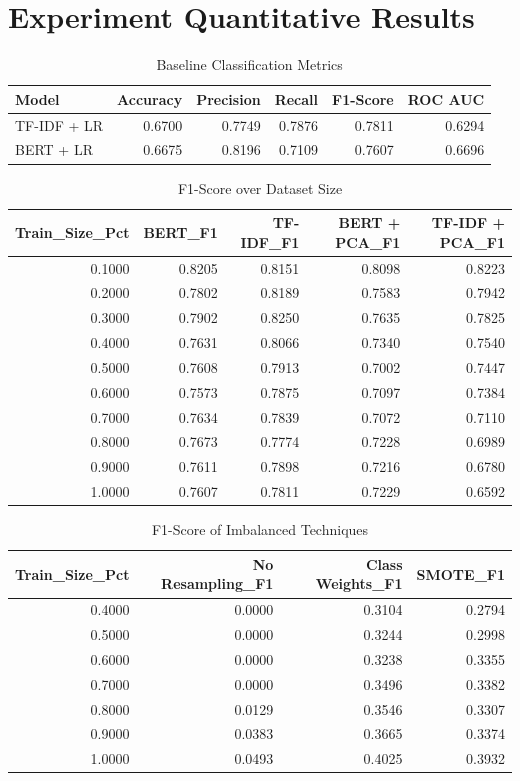 \section*{Experiment Quantitative Results}\n\n%
\begin{table}
\caption{Baseline Classification Metrics}
\label{tab:baseline}
\begin{tabular}{lrrrrr}
\hline
Model & Accuracy & Precision & Recall & F1-Score & ROC AUC \\
\hline
TF-IDF + LR & 0.6700 & 0.7749 & 0.7876 & 0.7811 & 0.6294 \\
BERT + LR & 0.6675 & 0.8196 & 0.7109 & 0.7607 & 0.6696 \\
\hline
\end{tabular}
\end{table}


\begin{table}
\caption{F1-Score over Dataset Size}
\label{tab:learning_curve}
\begin{tabular}{rrrrr}
\hline
Train_Size_Pct & BERT_F1 & TF-IDF_F1 & BERT + PCA_F1 & TF-IDF + PCA_F1 \\
\hline
0.1000 & 0.8205 & 0.8151 & 0.8098 & 0.8223 \\
0.2000 & 0.7802 & 0.8189 & 0.7583 & 0.7942 \\
0.3000 & 0.7902 & 0.8250 & 0.7635 & 0.7825 \\
0.4000 & 0.7631 & 0.8066 & 0.7340 & 0.7540 \\
0.5000 & 0.7608 & 0.7913 & 0.7002 & 0.7447 \\
0.6000 & 0.7573 & 0.7875 & 0.7097 & 0.7384 \\
0.7000 & 0.7634 & 0.7839 & 0.7072 & 0.7110 \\
0.8000 & 0.7673 & 0.7774 & 0.7228 & 0.6989 \\
0.9000 & 0.7611 & 0.7898 & 0.7216 & 0.6780 \\
1.0000 & 0.7607 & 0.7811 & 0.7229 & 0.6592 \\
\hline
\end{tabular}
\end{table}


\begin{table}
\caption{F1-Score of Imbalanced Techniques}
\label{tab:imbalance}
\begin{tabular}{rrrr}
\hline
Train_Size_Pct & No Resampling_F1 & Class Weights_F1 & SMOTE_F1 \\
\hline
0.4000 & 0.0000 & 0.3104 & 0.2794 \\
0.5000 & 0.0000 & 0.3244 & 0.2998 \\
0.6000 & 0.0000 & 0.3238 & 0.3355 \\
0.7000 & 0.0000 & 0.3496 & 0.3382 \\
0.8000 & 0.0129 & 0.3546 & 0.3307 \\
0.9000 & 0.0383 & 0.3665 & 0.3374 \\
1.0000 & 0.0493 & 0.4025 & 0.3932 \\
\hline
\end{tabular}
\end{table}


